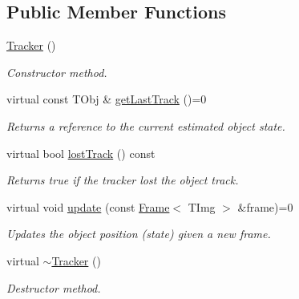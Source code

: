 \subsection*{Public Member Functions}
\begin{DoxyCompactItemize}
\item 
\hypertarget{class_vision_core_1_1_interfaces_1_1_tracker_aa43757593e7744038c0fc6c9c35b75a5}{}\hyperlink{class_vision_core_1_1_interfaces_1_1_tracker_aa43757593e7744038c0fc6c9c35b75a5}{Tracker} ()\label{class_vision_core_1_1_interfaces_1_1_tracker_aa43757593e7744038c0fc6c9c35b75a5}

\begin{DoxyCompactList}\small\item\em Constructor method. \end{DoxyCompactList}\item 
virtual const T\+Obj \& \hyperlink{class_vision_core_1_1_interfaces_1_1_tracker_a93ee7011307419e8c88db9f22d900657}{get\+Last\+Track} ()=0
\begin{DoxyCompactList}\small\item\em Returns a reference to the current estimated object state. \end{DoxyCompactList}\item 
virtual bool \hyperlink{class_vision_core_1_1_interfaces_1_1_tracker_af6217aec35983dca6dc39c91d08c1020}{lost\+Track} () const 
\begin{DoxyCompactList}\small\item\em Returns true if the tracker lost the object track. \end{DoxyCompactList}\item 
virtual void \hyperlink{class_vision_core_1_1_interfaces_1_1_tracker_aa298892351b5377fcdc227b6d53daf69}{update} (const \hyperlink{struct_vision_core_1_1_data_structures_1_1_frame}{Frame}$<$ T\+Img $>$ \&frame)=0
\begin{DoxyCompactList}\small\item\em Updates the object position (state) given a new frame. \end{DoxyCompactList}\item 
\hypertarget{class_vision_core_1_1_interfaces_1_1_tracker_a6ef2039344d051290df033a31fa7d8b3}{}virtual \hyperlink{class_vision_core_1_1_interfaces_1_1_tracker_a6ef2039344d051290df033a31fa7d8b3}{$\sim$\+Tracker} ()\label{class_vision_core_1_1_interfaces_1_1_tracker_a6ef2039344d051290df033a31fa7d8b3}

\begin{DoxyCompactList}\small\item\em Destructor method. \end{DoxyCompactList}\end{DoxyCompactItemize}
